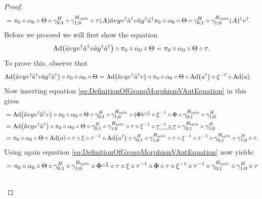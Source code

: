 \documentclass[11pt,a4paper,twoside]{article}
\numberwithin{equation}{section}
\begin{document}
\begin{proof}
\begin{align}
			\label{eq:lem:phi1phi2matchingCondition:Proof_v_Part1Appendix}
			&=\pi_0\circ\alpha_0\circ\Theta\circ\gamma^{H}_{0;1}\circ\gamma^{{H_{\text{split}}}}_{1;0}\circ\tau(A)\tilde{a}vyv^\dagger\tilde{a}^\dagger v \tilde{a}y^\dagger\tilde{a}^\dagger \pi_0\circ\alpha_0\circ\Theta\circ\gamma^{H}_{0;1}\circ\gamma^{{H_{\text{split}}}}_{1;0}(A)^\dagger v^\dagger.
		\end{align}
		Before we proceed we will first show the equation
		\begin{equation}\label{eq:lem:phi1phi2matchingCondition:Proof_v_Part2Appendix}
			\Ad{\tilde{a}vyv^\dagger\tilde{a}^\dagger v\tilde{a}y^\dagger\tilde{a}^\dagger}\circ\pi_0\circ\alpha_0\circ\Theta=\pi_0\circ\alpha_0\circ\Theta\circ\tau.
		\end{equation}
		To prove this, observe that
		\begin{align}
			&\Ad{\tilde{a}vyv^\dagger\tilde{a}^\dagger v\tilde{a}y^\dagger\tilde{a}^\dagger}\circ\pi_0\circ\alpha_0\circ\Theta=\Ad{\tilde{a}vyv^\dagger\tilde{a}^\dagger v}\circ\pi_0\circ\alpha_0\circ\Theta\circ\Ad{a^\dagger}\circ\xi^{-1}\circ\Ad{a}.
		\end{align}
		Now inserting equation \eqref{eq:DefinitionOfGroupMorphismVAutEquation} in this gives
		\begin{align}
			\nonumber
			&=\Ad{\tilde{a}vyv^\dagger\tilde{a}^\dagger v}\circ\pi_0\circ\alpha_0\circ\Theta\circ\gamma^{H}_{0;1}\circ\gamma^{\Hsplit}_{1;0}\circ\stkout{(\Phi)^{-1}}\circ\xi^{-1}\circ\stkout{\Phi}\circ\gamma^{\Hsplit}_{0;1}\circ\gamma^H_{1;0}\\
			&=\Ad{\tilde{a}vyv^\dagger\tilde{a}^\dagger }\circ\pi_0\circ\alpha_0\circ\Theta\circ\gamma^{H}_{0;1}\circ\gamma^{\Hsplit}_{1;0}\circ\tau\circ\xi^{-1}\circ\underline{\tau^{-1}\circ\tau}\circ\gamma^{\Hsplit}_{0;1}\circ\gamma^H_{1;0}\\
			\nonumber
			&=\pi_0\circ\alpha_0\circ\Theta\circ\Ad{a}\circ\tau\circ\xi\circ\tau^{-1}\circ\Ad{a^\dagger}\circ\gamma^{H}_{0;1}\circ\gamma^{\Hsplit}_{1;0}\circ\tau\circ\xi^{-1}\circ\tau^{-1}\circ\gamma^{\Hsplit}_{0;1}\circ\gamma^H_{1;0}\circ\tau.
		\end{align}
		Using again equation \eqref{eq:DefinitionOfGroupMorphismVAutEquation} now yields:
		\begin{align}
			&=\pi_0\circ\alpha_0\circ\Theta\circ\gamma^{H}_{0;1}\circ\gamma^{\Hsplit}_{1;0}\circ\stkout{\Phi^{-1}}\circ\tau\circ\xi\circ\tau^{-1}\circ\stkout{\Phi}\circ\tau\circ\xi^{-1}\circ\tau^{-1}\circ\gamma^{\Hsplit}_{0;1}\circ\gamma^H_{1;0}\circ\tau\\
			\nonumber

\end{align}
\end{proof}
\end{document}
